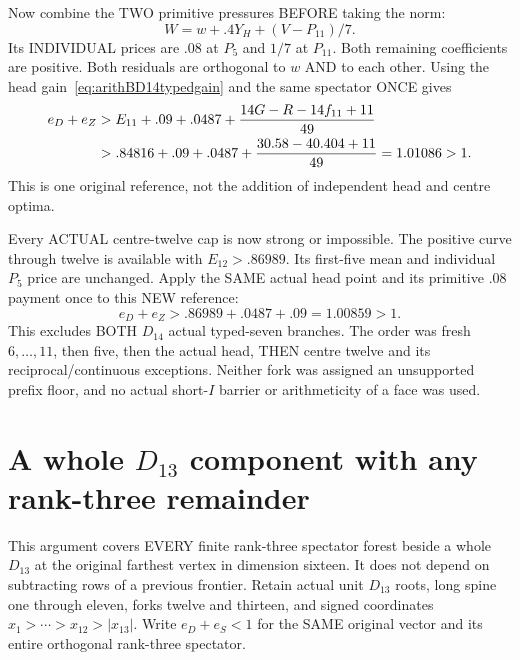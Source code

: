 Now combine the TWO primitive pressures BEFORE
taking the norm:
\[
                         W=w+.4Y_H+(V-P_{11})/7 .
\]
Its INDIVIDUAL prices are \(.08\) at \(P_5\)
and \(1/7\) at \(P_{11}\).
Both remaining coefficients are positive.
Both residuals are orthogonal to \(w\) AND to
each other.
Using the head gain~\eqref{eq:arithBD14typedgain}
and the same spectator ONCE gives
\[
 \begin{split}
 e_D+e_Z
 &>E_{11}+.09+.0487+
                  {14G-R-14f_{11}+11\over49}\\
 &>.84816+.09+.0487+
                  {30.58-40.404+11\over49}
   =1.01086>1 .
 \end{split}
\]
This is one original reference, not the addition
of independent head and centre optima.

Every ACTUAL centre-twelve cap is now strong
or impossible.
The positive curve through twelve is available
with \(E_{12}>.86989\).
Its first-five mean and individual \(P_5\) price
are unchanged.
Apply the SAME actual head point and its primitive
\(.08\) payment once to this NEW reference:
\[
                       e_D+e_Z>.86989+.0487+.09=1.00859>1.
\]
This excludes BOTH \(D_{14}\) actual typed-seven
branches.
The order was fresh \(6,\ldots,11\), then five,
then the actual head, THEN centre twelve and its
reciprocal/continuous exceptions.
Neither fork was assigned an unsupported prefix
floor, and no actual short-\(I\) barrier or
arithmeticity of a face was used.

\section{A whole \(D_{13}\) component with any rank-three remainder}
\label{app:arithD13rankthree}

This argument covers EVERY finite rank-three spectator
forest beside a whole \(D_{13}\) at the original
farthest vertex in dimension sixteen.
It does not depend on subtracting rows of a
previous frontier.
Retain actual unit \(D_{13}\) roots, long spine
one through eleven, forks twelve and thirteen,
and signed coordinates
\(x_1>\cdots>x_{12}>|x_{13}|\).
Write \(e_D+e_S<1\) for the SAME original vector
and its entire orthogonal rank-three spectator.

